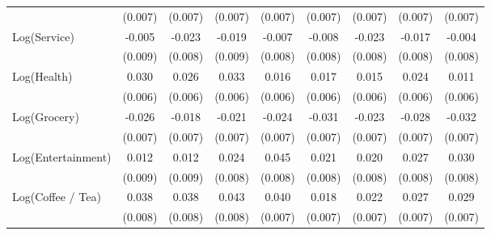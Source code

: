 {\begin{tabular}{l*{8}{c}}
                    &     (0.007)         &     (0.007)         &     (0.007)         &     (0.007)         &     (0.007)         &     (0.007)         &     (0.007)         &     (0.007)         \\
Log(Service)        &      -0.005         &      -0.023\sym{**} &      -0.019\sym{**} &      -0.007         &      -0.008         &      -0.023\sym{**} &      -0.017\sym{**} &      -0.004         \\
                    &     (0.009)         &     (0.008)         &     (0.009)         &     (0.008)         &     (0.008)         &     (0.008)         &     (0.008)         &     (0.008)         \\
Log(Health)         &       0.030\sym{***}&       0.026\sym{***}&       0.033\sym{***}&       0.016\sym{**} &       0.017\sym{**} &       0.015\sym{**} &       0.024\sym{***}&       0.011\sym{*}  \\
                    &     (0.006)         &     (0.006)         &     (0.006)         &     (0.006)         &     (0.006)         &     (0.006)         &     (0.006)         &     (0.006)         \\
Log(Grocery)        &      -0.026\sym{***}&      -0.018\sym{**} &      -0.021\sym{***}&      -0.024\sym{***}&      -0.031\sym{***}&      -0.023\sym{***}&      -0.028\sym{***}&      -0.032\sym{***}\\
                    &     (0.007)         &     (0.007)         &     (0.007)         &     (0.007)         &     (0.007)         &     (0.007)         &     (0.007)         &     (0.007)         \\
Log(Entertainment)  &       0.012         &       0.012         &       0.024\sym{***}&       0.045\sym{***}&       0.021\sym{**} &       0.020\sym{**} &       0.027\sym{***}&       0.030\sym{***}\\
                    &     (0.009)         &     (0.009)         &     (0.008)         &     (0.008)         &     (0.008)         &     (0.008)         &     (0.008)         &     (0.008)         \\
Log(Coffee / Tea)   &       0.038\sym{***}&       0.038\sym{***}&       0.043\sym{***}&       0.040\sym{***}&       0.018\sym{**} &       0.022\sym{***}&       0.027\sym{***}&       0.029\sym{***}\\
                    &     (0.008)         &     (0.008)         &     (0.008)         &     (0.007)         &     (0.007)         &     (0.007)         &     (0.007)         &     (0.007)         \\

\end{tabular}}
